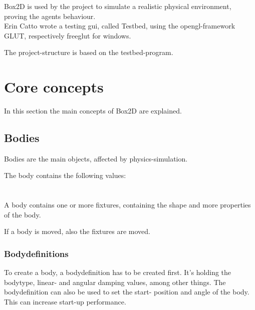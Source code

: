 \documentclass[10pt,a4paper,DIV=11]{scrreprt}
\begin{document}
Box2D is used by the project to simulate a realistic physical environment, proving the agents behaviour. \\

Erin Catto wrote a testing gui, called Testbed, using the opengl-framework GLUT, respectively freeglut for windows.

The project-structure is based on the testbed-program.


\section{Core concepts}
In this section the main concepts of Box2D are explained.


\subsection{Bodies}
Bodies are the main objects, affected by physics-simulation.

The body contains the following values: \\

   \\
\\

A body contains one or more fixtures, containing the shape and more properties of the body.

If a body is moved, also the fixtures are moved.

\subsubsection*{Bodydefinitions}
To create a body, a bodydefinition has to be created first. It's holding the bodytype, linear- and angular damping values, among other things.
The bodydefinition can also be used to set the start- position and angle of the body. This can increase start-up performance.
\end{document}
